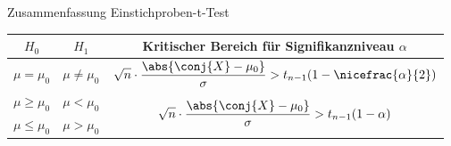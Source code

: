 \begin{bonus}{Zusammenfassung Einstichproben-t-Test}
    \begin{center}
        \begin{tabular}{|c|c|c|}
            \hline
            $H_0$                          & $H_1$                             & Kritischer Bereich für Signifikanzniveau $\alpha$                                                                          \\
            \hline
            \multirow{2}{*}{$\mu = \mu_0$} & \multirow{2}{*}{$\mu \neq \mu_0$} & \multirow{2}{*}{$\displaystyle \sqrt{n} \cdot \frac{\abs{\conj{X} - \mu_0}}{\sigma} > t_{n-1} (1 - \nicefrac{\alpha}{2})$} \\
                                           &                                   &                                                                                                                            \\
            \hline
            $\mu \geq \mu_0$               & $\mu < \mu_0$                     & \multirow{2}{*}{$\displaystyle \sqrt{n} \cdot \frac{\abs{\conj{X} - \mu_0}}{\sigma} > t_{n-1} (1 - \alpha)$}               \\
            $\mu \leq \mu_0$               & $\mu > \mu_0$                     &                                                                                                                            \\
            \hline
        \end{tabular}
    \end{center}
\end{bonus}

